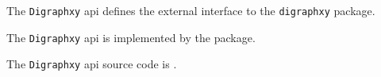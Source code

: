 
The {\tt Digraphxy} api defines the external interface to the {\tt digraphxy} package.

The {\tt Digraphxy} api is implemented by the  package.

The {\tt Digraphxy} api source code is .
